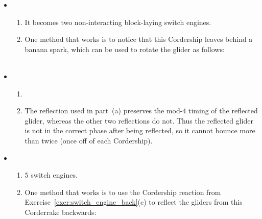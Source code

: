 \begin{multicols}{2}
\begin{itemize}[leftmargin=0em]
\begin{enumerate}[leftmargin=1.5em,label=\bf\color{ocre}(\alph*)]
			 \\
		\end{enumerate}
		
		
		\item[\bf\color{ocre}\sffamily\ref{exer:3_engine_cordership}]
		\begin{enumerate}[leftmargin=1.5em,label=\bf\color{ocre}(\alph*)]
			\item It becomes two non-interacting block-laying switch engines.
			
			\item One method that works is to notice that this Cordership leaves behind a banana spark, which can be used to rotate the glider as follows: \\[-0.6em]
			
			 \\
		\end{enumerate}
	

		\item[\bf\color{ocre}\sffamily\ref{exer:2_engine_cordership}]
		\begin{enumerate}[leftmargin=1.5em,label=\bf\color{ocre}(\alph*)]
			\item {} \\
			
			\item The reflection used in part~(a) preserves the mod-$4$ timing of the reflected glider, whereas the other two reflections do not. Thus the reflected glider is not in the correct phase after being reflected, so it cannot bounce more than twice (once off of each Cordership). \\
		\end{enumerate}
		
		
		\item[\bf\color{ocre}\sffamily\ref{exer:corderrake}]
		\begin{enumerate}[leftmargin=1.5em,label=\bf\color{ocre}(\alph*)]
			\item $5$ switch engines.
			
			\item One method that works is to use the Cordership reaction from Exercise~\ref{exer:switch_engine_back}(c) to reflect the gliders from this Corderrake backwards: \\[-0.6em]
			

\end{enumerate}
\end{itemize}
\end{multicols}
